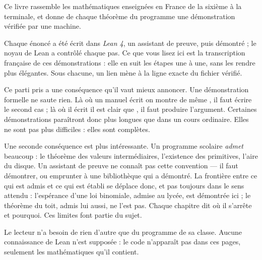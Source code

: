 Ce livre rassemble les mathématiques enseignées en France de la sixième à la terminale, et
donne de chaque théorème du programme une démonstration vérifiée par une machine.

Chaque énoncé a été écrit dans \emph{Lean 4}, un assistant de preuve, puis démontré ; le
noyau de Lean a contrôlé chaque pas. Ce que vous lisez ici est la transcription française de
ces démonstrations : elle en suit les étapes une à une, sans les rendre plus élégantes.
Sous chacune, un lien mène à la ligne exacte du fichier vérifié.

Ce parti pris a une conséquence qu'il vaut mieux annoncer. Une démonstration formelle ne
saute rien. Là où un manuel écrit \og{} on montre de même \fg{}, il faut écrire le second
cas ; là où il écrit \og{} il est clair que \fg{}, il faut produire l'argument. Certaines
démonstrations paraîtront donc plus longues que dans un cours ordinaire. Elles ne sont pas
plus difficiles : elles sont complètes.

Une seconde conséquence est plus intéressante. Un programme scolaire \emph{admet} beaucoup :
le théorème des valeurs intermédiaires, l'existence des primitives, l'aire du disque. Un
assistant de preuve ne connaît pas cette convention — il faut démontrer, ou emprunter à une
bibliothèque qui a démontré. La frontière entre ce qui est admis et ce qui est établi se
déplace donc, et pas toujours dans le sens attendu : l'espérance d'une loi binomiale, admise
au lycée, est démontrée ici ; le théorème du toit, admis lui aussi, ne l'est pas. Chaque
chapitre dit où il s'arrête et pourquoi. Ces limites font partie du sujet.

Le lecteur n'a besoin de rien d'autre que du programme de sa classe. Aucune connaissance de
Lean n'est supposée : le code n'apparaît pas dans ces pages, seulement les mathématiques
qu'il contient.
